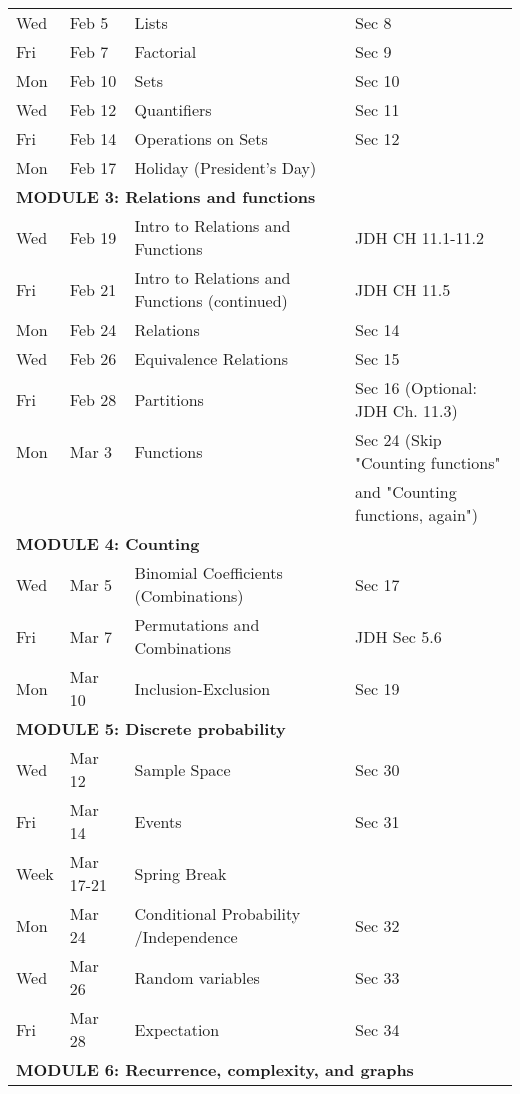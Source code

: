 \documentclass[letterpaper]{inzane_syllabus} %
\begin{document}
\begin{center}
\begin{tabularx}{\textwidth}{p{2cm}p{2cm}p{8cm}p{9.5cm}}
Wed &  Feb 5 & Lists & Sec 8 \\
Fri &  Feb 7 & Factorial & Sec 9 \\
Mon &  Feb 10 & Sets & Sec 10 \\
Wed &  Feb 12 & Quantifiers &  Sec 11  \\
Fri &  Feb 14 & Operations on Sets & Sec 12 \\
Mon &  Feb 17 & Holiday (President's Day) & \\
\hline
\multicolumn{4}{l}{\textbf{\textcolor{myCOLOR}{\large MODULE 3: Relations and functions }}} \\
\hline
Wed &  Feb 19 & Intro to Relations and Functions & JDH CH 11.1-11.2\\
Fri &  Feb 21  & Intro to Relations and Functions (continued) & JDH CH 11.5\\
Mon &  Feb 24 & Relations & Sec 14 \\
Wed &  Feb 26 & Equivalence Relations & Sec 15 \\
Fri &  Feb 28 & Partitions & Sec 16 (Optional: JDH Ch. 11.3)\\
Mon &  Mar 3 & Functions & Sec 24 (Skip "Counting functions" \\
 & & & \quad and "Counting functions, again")\\
\hline
\multicolumn{4}{l}{\textbf{\textcolor{myCOLOR}{\large MODULE 4: Counting}}} \\
\hline
Wed &  Mar 5  & Binomial Coefficients (Combinations) & Sec 17  \\
Fri &  Mar 7  & Permutations and Combinations & JDH Sec 5.6\\
 Mon &  Mar 10 & Inclusion-Exclusion & Sec 19 \\
\hline
\multicolumn{4}{l}{\textbf{\textcolor{myCOLOR}{\large MODULE 5: Discrete probability}}} \\
\hline
Wed &  Mar 12 & Sample Space  & Sec 30 \\
Fri &  Mar 14 & Events & Sec 31 \\
Week &  Mar 17-21 & Spring Break & \\ 
Mon &  Mar 24 &  Conditional Probability /Independence &  Sec 32\\
Wed &  Mar 26 & Random variables & Sec 33 \\
Fri & Mar 28 & Expectation & Sec 34 \\
\hline
\multicolumn{4}{l}{\textbf{\textcolor{myCOLOR}{\large MODULE 6: Recurrence, complexity, and graphs}}} \\

\end{tabularx}
\end{center}
\end{document}
